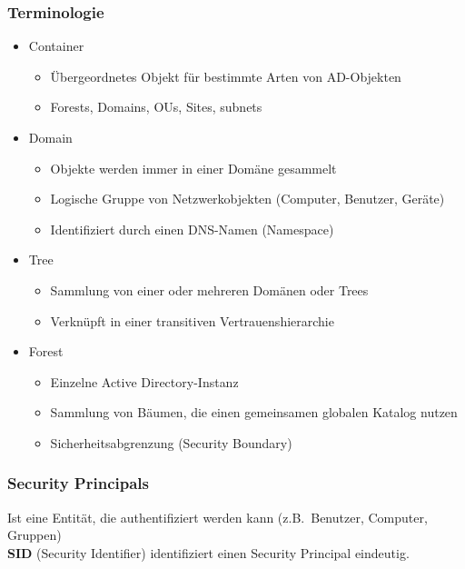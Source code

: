 \subsubsection{Terminologie}
\begin{itemize}
    \item Container
    \begin{itemize}
        \item Übergeordnetes Objekt für bestimmte Arten von AD-Objekten
        \item Forests, Domains, OUs, Sites, subnets
    \end{itemize}
    \item Domain
    \begin{itemize}
        \item Objekte werden immer in einer Domäne gesammelt
        \item Logische Gruppe von Netzwerkobjekten (Computer, Benutzer, Geräte)
        \item Identifiziert durch einen DNS-Namen (Namespace)
    \end{itemize}
    \item Tree
    \begin{itemize}
        \item Sammlung von einer oder mehreren Domänen oder Trees
        \item Verknüpft in einer transitiven Vertrauenshierarchie
    \end{itemize}
    \item Forest
    \begin{itemize}
        \item Einzelne Active Directory-Instanz
        \item Sammlung von Bäumen, die einen gemeinsamen globalen Katalog nutzen
        \item Sicherheitsabgrenzung (Security Boundary)
    \end{itemize}
\end{itemize}

\subsubsection{Security Principals}
Ist eine Entität, die authentifiziert werden kann (z.B.\ Benutzer, Computer, Gruppen)\\

\textbf{SID} (Security Identifier) identifiziert einen Security Principal eindeutig.\\

